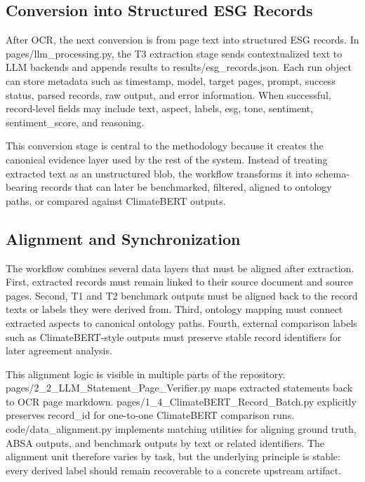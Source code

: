 \subsection{Conversion into Structured ESG Records}

After OCR, the next conversion is from page text into structured ESG records. In pages/llm\_processing.py, the T3 extraction stage sends contextualized text to LLM backends and appends results to results/esg\_records.json. Each run object can store metadata such as timestamp, model, target pages, prompt, success status, parsed records, raw output, and error information. When successful, record-level fields may include text, aspect, labels, esg, tone, sentiment, sentiment\_score, and reasoning.

This conversion stage is central to the methodology because it creates the canonical evidence layer used by the rest of the system. Instead of treating extracted text as an unstructured blob, the workflow transforms it into schema-bearing records that can later be benchmarked, filtered, aligned to ontology paths, or compared against ClimateBERT outputs.

\subsection{Alignment and Synchronization}

The workflow combines several data layers that must be aligned after extraction. First, extracted records must remain linked to their source document and source pages. Second, T1 and T2 benchmark outputs must be aligned back to the record texts or labels they were derived from. Third, ontology mapping must connect extracted aspects to canonical ontology paths. Fourth, external comparison labels such as ClimateBERT-style outputs must preserve stable record identifiers for later agreement analysis.

This alignment logic is visible in multiple parts of the repository. pages/2\_2\_LLM\_Statement\_Page\_Verifier.py maps extracted statements back to OCR page markdown. pages/1\_4\_ClimateBERT\_Record\_Batch.py explicitly preserves record\_id for one-to-one ClimateBERT comparison runs. code/data\_alignment.py implements matching utilities for aligning ground truth, ABSA outputs, and benchmark outputs by text or related identifiers. The alignment unit therefore varies by task, but the underlying principle is stable: every derived label should remain recoverable to a concrete upstream artifact.

